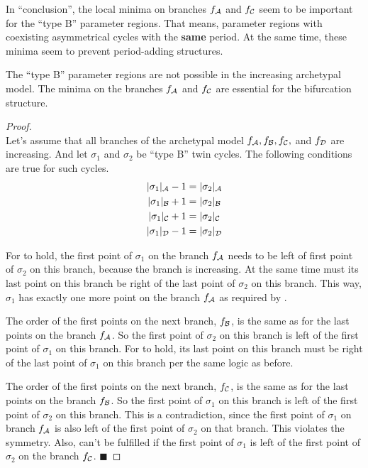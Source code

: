 In ``conclusion'', the local minima on branches $f_{\mathcal{A}}$ and $f_{\mathcal{C}}$ seem to be important for the ``type B'' parameter regions.
That means, parameter regions with coexisting asymmetrical cycles with the \textbf{same} period.
At the same time, these minima seem to prevent period-adding structures.

\begin{theorem}
	The ``type B'' parameter regions are not possible in the increasing archetypal model.
	The minima on the branches $f_{\mathcal{A}}$ and $f_{\mathcal{C}}$ are essential for the bifurcation structure.
\end{theorem}

\begin{proof} \phantom{x} \\
	Let's assume that all branches of the archetypal model $f_{\mathcal{A}}, f_{\mathcal{B}}, f_{\mathcal{C}},$ and $f_{\mathcal{D}}$ are increasing.
	And let $\sigma_1$ and $\sigma_2$ be ``type B'' twin cycles.
	The following conditions are true for such cycles.
	\begin{subequations}
		\begin{align}
			|\sigma_1|_{\mathcal{A}} - 1 & = |\sigma_2|_{\mathcal{A}} \label{equ:add.change.conseq.sigmaA} \\
			|\sigma_1|_{\mathcal{B}} + 1 & = |\sigma_2|_{\mathcal{B}} \label{equ:add.change.conseq.sigmaB} \\
			|\sigma_1|_{\mathcal{C}} + 1 & = |\sigma_2|_{\mathcal{C}} \label{equ:add.change.conseq.sigmaC} \\
			|\sigma_1|_{\mathcal{D}} - 1 & = |\sigma_2|_{\mathcal{D}} \label{equ:add.change.conseq.sigmaD}
		\end{align}
	\end{subequations}

	For  to hold, the first point of $\sigma_1$ on the branch $f_{\mathcal{A}}$ needs to be left of first point of $\sigma_2$ on this branch, because the branch is increasing.
	At the same time must its last point on this branch be right of the last point of $\sigma_2$ on this branch.
	This way, $\sigma_1$ has exactly one more point on the branch $f_{\mathcal{A}}$ as required by .

	The order of the first points on the next branch, $f_{\mathcal{B}}$, is the same as for the last points on the branch $f_{\mathcal{A}}$.
	So the first point of $\sigma_2$ on this branch is left of the first point of $\sigma_1$ on this branch.
	For  to hold, its last point on this branch must be right of the last point of $\sigma_1$ on this branch per the same logic as before.

	The order of the first points on the next branch, $f_{\mathcal{C}}$, is the same as for the last points on the branch $f_{\mathcal{B}}$.
	So the first point of $\sigma_1$ on this branch is left of the first point of $\sigma_2$ on this branch.
	This is a contradiction, since the first point of $\sigma_1$ on branch $f_{\mathcal{A}}$ is also left of the first point of $\sigma_2$ on that branch.
	This violates the symmetry.
	Also,  can't be fulfilled if the first point of $\sigma_1$ is left of the first point of $\sigma_2$ on the branch $f_{\mathcal{C}}$.
	\hfill $\blacksquare$
\end{proof}

